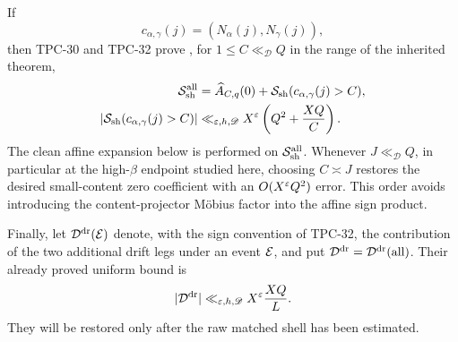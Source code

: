 If
\begin{equation}
 c_{\alpha,\gamma}(j)
 =(N_\alpha(j),N_\gamma(j)),
 \label{eq:tpc33-target-content}
\end{equation}
then TPC-30 and TPC-32 prove \citep{WangTPC30,WangTPC32}, for
\(1\le C\ll_{\mathscr D}Q\) in the range of the inherited theorem,
\begin{align}
 \mathcal S_{\rm sh}^{\rm all}
 &=\widehat A_{C,q}(0)
   +\mathcal S_{\rm sh}(c_{\alpha,\gamma}(j)>C),
 \label{eq:tpc33-zero-splice}\\
 |\mathcal S_{\rm sh}(c_{\alpha,\gamma}(j)>C)|
 &\ll_{\varepsilon,h,\mathscr D}
 X^\varepsilon\left(Q^2+\frac{XQ}{C}\right).
 \label{eq:tpc33-large-content-bound}
\end{align}
The clean affine expansion below is performed on
\(\mathcal S_{\rm sh}^{\rm all}\).  Whenever \(J\ll_{\mathscr D}Q\), in particular
at the high-\(\beta\) endpoint studied here, choosing \(C\asymp J\) restores
the desired small-content zero coefficient with an \(O(X^\varepsilon Q^2)\) error.
This order
avoids introducing the content-projector M\"obius factor into the affine
sign product.

Finally, let \(\mathcal D^{\rm dr}(\mathcal E)\) denote, with the sign convention of
TPC-32, the contribution of the two additional drift legs under an event
\(\mathcal E\), and put \(\mathcal D^{\rm dr}=\mathcal D^{\rm dr}(\text{all})\).  Their already
proved uniform bound is
\begin{equation}
 |\mathcal D^{\rm dr}|
 \ll_{\varepsilon,h,\mathscr D}X^\varepsilon\frac{XQ}{L}.
 \label{eq:tpc33-drift-bound}
\end{equation}
They will be restored only after the raw matched shell has been estimated.
